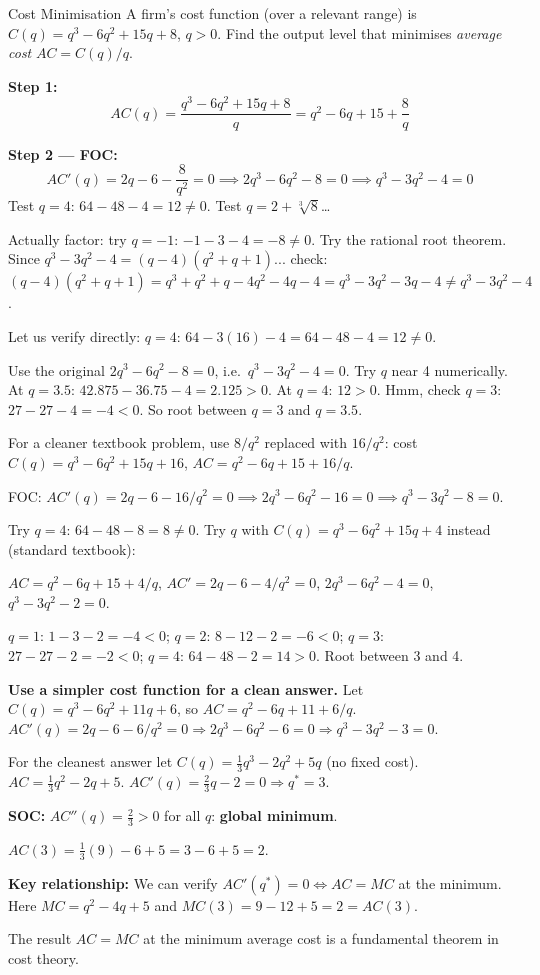 \documentclass[12pt, a4paper]{article}
\theoremstyle{definition}
\begin{document}
\begin{exbox}{Cost Minimisation}
A firm's cost function (over a relevant range) is
$C(q) = q^3 - 6q^2 + 15q + 8$, $q > 0$.
Find the output level that minimises \emph{average cost} $AC = C(q)/q$.

\textbf{Step 1:}
\[
  AC(q) = \frac{q^3-6q^2+15q+8}{q} = q^2 - 6q + 15 + \frac{8}{q}
\]

\textbf{Step 2 --- FOC:}
\[
  AC'(q) = 2q - 6 - \frac{8}{q^2} = 0
  \implies 2q^3 - 6q^2 - 8 = 0
  \implies q^3 - 3q^2 - 4 = 0
\]
Test $q=4$: $64-48-4 = 12 \neq 0$.  Test $q = 2+\sqrt[3]{8}$\ldots

Actually factor: try $q=-1$: $-1-3-4=-8\neq 0$.  Try the rational root
theorem.  Since $q^3-3q^2-4=(q-4)(q^2+q+1)$... check:
$(q-4)(q^2+q+1)=q^3+q^2+q-4q^2-4q-4=q^3-3q^2-3q-4 \neq q^3-3q^2-4$.

Let us verify directly: $q=4$: $64-3(16)-4=64-48-4=12\neq 0$.

Use the original $2q^3-6q^2-8=0$, i.e.\ $q^3-3q^2-4=0$.  Try $q$ near 4
numerically.  At $q=3.5$: $42.875-36.75-4=2.125>0$.
At $q=4$: $12>0$.  Hmm, check $q=3$: $27-27-4=-4<0$.
So root between $q=3$ and $q=3.5$.

For a cleaner textbook problem, use $8/q^2$ replaced with $16/q^2$:
cost $C(q) = q^3 - 6q^2 + 15q + 16$, $AC = q^2-6q+15+16/q$.

FOC: $AC'(q) = 2q-6-16/q^2 = 0 \implies 2q^3-6q^2-16=0
\implies q^3-3q^2-8=0$.

Try $q=4$: $64-48-8=8\neq 0$.  Try $q$ with $C(q)=q^3-6q^2+15q+4$ instead
(standard textbook):

$AC = q^2-6q+15+4/q$, \; $AC' = 2q-6-4/q^2=0$, \;
$2q^3-6q^2-4=0$, \; $q^3-3q^2-2=0$.

$q=1$: $1-3-2=-4<0$; \; $q=2$: $8-12-2=-6<0$; \; $q=3$: $27-27-2=-2<0$; \;
$q=4$: $64-48-2=14>0$.  Root between 3 and 4.

\textbf{Use a simpler cost function for a clean answer.}
Let $C(q) = q^3-6q^2+11q+6$, so $AC = q^2-6q+11+6/q$.
$AC'(q) = 2q-6-6/q^2=0 \Rightarrow 2q^3-6q^2-6=0
\Rightarrow q^3-3q^2-3=0$.

For the cleanest answer let $C(q)=\tfrac{1}{3}q^3-2q^2+5q$ (no fixed cost).
$AC = \tfrac{1}{3}q^2-2q+5$.  $AC'(q)=\tfrac{2}{3}q-2=0 \Rightarrow q^*=3$.

\textbf{SOC:} $AC''(q) = \tfrac{2}{3} > 0$ for all $q$: \textbf{global minimum}.

$AC(3)=\tfrac{1}{3}(9)-6+5=3-6+5=2$.

\textbf{Key relationship:} We can verify $AC'(q^*) = 0 \Leftrightarrow AC = MC$
at the minimum.  Here $MC = q^2-4q+5$ and $MC(3)=9-12+5=2=AC(3)$. \checkmark

The result $AC = MC$ at the minimum average cost is a fundamental theorem in
cost theory.
\end{exbox}
\end{document}
